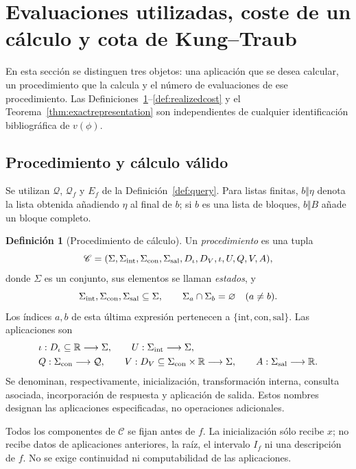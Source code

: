 \documentclass[11pt,a4paper]{article}
\numberwithin{equation}{section}
\theoremstyle{definition}
\newtheorem{definition}[theorem]{Definición}
\theoremstyle{remark}
\newcommand{\R}{\mathbb R}
\newcommand{\QQ}{\mathcal Q}
\begin{document}
\par
\bigskip

\section{Evaluaciones utilizadas, coste de un cálculo y cota de Kung--Traub}\label{sec:KT}

En esta sección se distinguen tres objetos: una aplicación que se desea calcular, un procedimiento que la calcula y el número de evaluaciones de ese procedimiento. Las Definiciones~\ref{def:calc}--\ref{def:realizedcost} y el Teorema~\ref{thm:exactrepresentation} son independientes de cualquier identificación bibliográfica de $v(\phi)$.

\subsection{Procedimiento y cálculo válido}
Se utilizan $\QQ$, $\QQ_f$ y $E_f$ de la Definición~\ref{def:query}. Para listas finitas, $b\Vert\eta$ denota la lista obtenida añadiendo $\eta$ al final de $b$; si $b$ es una lista de bloques, $b\Vert B$ añade un bloque completo.

\begin{definition}[Procedimiento de cálculo]\label{def:calc}
Un \emph{procedimiento} es una tupla
\[
\mathscr C=(\Sigma,\Sigma_{\rm int},\Sigma_{\rm con},\Sigma_{\rm sal},D_\iota,D_V,\iota,U,Q,V,A),
\]
donde $\Sigma$ es un conjunto, sus elementos se llaman \emph{estados}, y
\[
\Sigma_{\rm int},\Sigma_{\rm con},\Sigma_{\rm sal}\subseteq\Sigma,
\qquad
\Sigma_a\cap\Sigma_b=\varnothing\quad(a\ne b).
\]
Los índices $a,b$ de esta última expresión pertenecen a $\{\mathrm{int},\mathrm{con},\mathrm{sal}\}$. Las aplicaciones son
\begin{align*}
&\iota:D_\iota\subseteq\R\longrightarrow\Sigma,\qquad
U:\Sigma_{\rm int}\longrightarrow\Sigma,\\
&Q:\Sigma_{\rm con}\longrightarrow\QQ,\qquad
V:D_V\subseteq\Sigma_{\rm con}\times\R\longrightarrow\Sigma,\qquad
A:\Sigma_{\rm sal}\longrightarrow\R.
\end{align*}
Se denominan, respectivamente, inicialización, transformación interna, consulta asociada, incorporación de respuesta y aplicación de salida. Estos nombres designan las aplicaciones especificadas, no operaciones adicionales.

Todos los componentes de $\mathscr C$ se fijan antes de $f$. La inicialización sólo recibe $x$; no recibe datos de aplicaciones anteriores, la raíz, el intervalo $I_f$ ni una descripción de $f$. No se exige continuidad ni computabilidad de las aplicaciones.
\end{definition}
\end{document}
